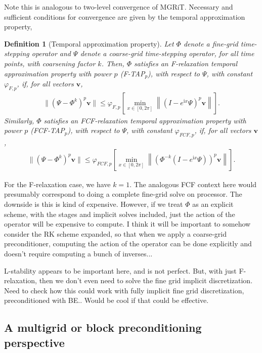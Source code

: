 \documentclass[a4paper,10pt]{article}
\newtheorem{definition}{Definition}
\begin{document}
Note this is analogous to two-level convergence of MGRiT. Necessary and sufficient conditions
for convergence are given by the temporal approximation property,
%
\begin{definition}[Temporal approximation property]
Let $\Phi$ denote a fine-grid time-stepping operator and $\Psi$ denote a coarse-grid time-stepping operator, for all time points,
with coarsening factor $k$. Then, $\Phi$ satisfies an F-relaxation temporal approximation property with power $p$
(F-TAP$_p$), with respect to $\Psi$, with constant $\varphi_{F,p}$, if, for all vectors $\mathbf{v}$,
\begin{align}\label{eq:tap_f}
\|(\Psi - \Phi^k)^p\mathbf{v}\| \leq \varphi_{F,p} \left[\min_{x\in[0,2\pi]} \left\| (I - e^{\mathrm{i}x}\Psi )^p\mathbf{v}\right\| \right].
\end{align}
Similarly, $\Phi$ satisfies an FCF-relaxation temporal approximation property with power $p$ (FCF-TAP$_p$), with
respect to $\Psi$, with constant $\varphi_{FCF,p}$, if, for all vectors $\mathbf{v}$,
\begin{align}\label{eq:tap_fcf}
\|(\Psi - \Phi^k)^p\mathbf{v}\| \leq \varphi_{FCF,p}\left[\min_{x\in[0,2\pi]} \left\| (\Phi^{-k}(I - e^{\mathrm{i}x}\Psi) )^p\mathbf{v}\right\| \right].
\end{align}
\end{definition}
%
For the F-relaxation case, we have $k = 1$. The analogous FCF context here would presumably
correspond to doing a complete fine-grid solve on processor. The downside is this is kind of
expensive. However, if we treat $\Phi$ as an explicit scheme, with the stages and implicit 
solves included, just the action of the operator will be expensive to compute. I think it will
be important to somehow consider the RK scheme expanded, so that when we apply a coarse-grid
preconditioner, computing the action of the operator can be done explicitly and doesn't require
computing a bunch of inverses...

L-stability appears to be important here, and is not perfect. But, with just F-relaxation, then
we don't even need to solve the fine grid implicit discretization. Need to check how this could
work with fully implicit fine grid discretization, preconditioned with BE.. Would be cool if that
could be effective. 


\subsection{A multigrid or block preconditioning perspective}
\end{document}
